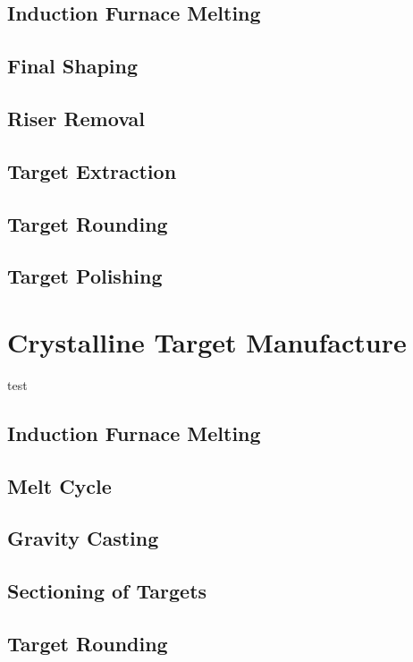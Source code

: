 \documentclass[a4paper,12pt,oneside]{report}%
\begin{document}
\subsection{Induction Furnace Melting}

\subsection{Final Shaping}

\subsection{Riser Removal} 

\subsection{Target Extraction}

\subsection{Target Rounding}

\subsection{Target Polishing}

\section{Crystalline Target Manufacture}
test
\subsection{Induction Furnace Melting}

\subsection{Melt Cycle}

\subsection{Gravity Casting}

\subsection{Sectioning of Targets}

\subsection{Target Rounding}
\end{document}

